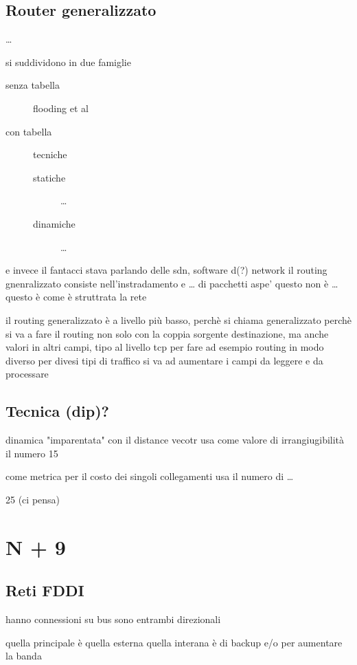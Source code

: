 \documentclass[11pt]{article}
\begin{document}
\subsection{Router generalizzato}
\label{sec:orgdcb2b36}
\ldots{}

si suddividono in due famiglie
\begin{description}
\item[{senza tabella}] flooding et al
\item[{con tabella}] tecniche
\begin{description}
\item[{statiche}] \ldots{}
\item[{dinamiche}] \ldots{}
\end{description}
\end{description}

e invece il fantacci stava parlando delle sdn, software d(?) network
il routing gnenralizzato consiste nell'instradamento e \ldots{} di pacchetti
aspe' questo non è \ldots{} questo è come è struttrata la rete

il routing generalizzato è a livello più basso, perchè si chiama generalizzato
perchè si va a fare il routing non solo con la coppia sorgente destinazione, ma anche valori in altri campi, tipo al livello tcp
per fare ad esempio routing in modo diverso per divesi tipi di traffico 
si va ad aumentare i campi da leggere e da processare

\subsection{Tecnica (dip)?}
\label{sec:org91284e1}
dinamica
"imparentata" con il distance vecotr
usa come valore di irrangiugibilità il numero 15

come metrica per il costo dei singoli collegamenti usa il numero di \ldots{}

25
(ci pensa)

\section{N + 9}
\label{sec:orgcf17fc6}
\subsection{Reti FDDI}
\label{sec:orgce05e97}
hanno connessioni su bus
sono entrambi direzionali

quella principale è quella esterna
quella interana è di backup e/o per aumentare la banda
\end{document}
